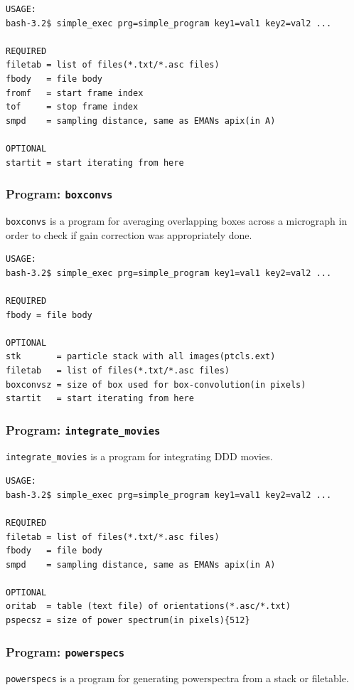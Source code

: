 \documentclass[a4paper,11pt]{article}
\newcommand{\prgname}[1]{\textcolor{NavyBlue}{\texttt{#1}}}
\begin{document}
\begin{verbatim}
USAGE:
bash-3.2$ simple_exec prg=simple_program key1=val1 key2=val2 ...

REQUIRED
filetab = list of files(*.txt/*.asc files)
fbody   = file body
fromf   = start frame index
tof     = stop frame index
smpd    = sampling distance, same as EMANs apix(in A)

OPTIONAL
startit = start iterating from here
\end{verbatim}

\subsubsection{Program: \prgname{boxconvs}}
\label{boxconvs}
\prgname{boxconvs} is a program for averaging overlapping boxes across a micrograph in order to check if gain correction was appropriately done.

\begin{verbatim}
USAGE:
bash-3.2$ simple_exec prg=simple_program key1=val1 key2=val2 ...

REQUIRED
fbody = file body

OPTIONAL
stk       = particle stack with all images(ptcls.ext)
filetab   = list of files(*.txt/*.asc files)
boxconvsz = size of box used for box-convolution(in pixels)
startit   = start iterating from here
\end{verbatim}

\subsubsection{Program: \prgname{integrate\_movies}}
\label{integrate_movies}
\prgname{integrate\_movies} is a program for integrating DDD movies.

\begin{verbatim}
USAGE:
bash-3.2$ simple_exec prg=simple_program key1=val1 key2=val2 ...

REQUIRED
filetab = list of files(*.txt/*.asc files)
fbody   = file body
smpd    = sampling distance, same as EMANs apix(in A)

OPTIONAL
oritab  = table (text file) of orientations(*.asc/*.txt)
pspecsz = size of power spectrum(in pixels){512}
\end{verbatim}

\subsubsection{Program: \prgname{powerspecs}}
\label{powerspecs}
\prgname{powerspecs} is a program for generating powerspectra from a stack or filetable.
\end{document}
